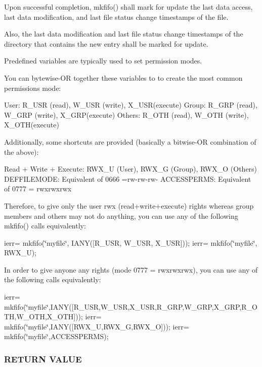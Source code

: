 Upon successful completion, mkfifo() shall mark for update the last data access, last data modification, and last file status change timestamps of the file.

Also, the last data modification and last file status change timestamps of the directory that contains the new entry shall be marked for update.

Predefined variables are typically used to set permission modes.

You can bytewise-\/\+OR together these variables to to create the most common permissions mode\+:

User\+: R\+\_\+\+U\+SR (read), W\+\_\+\+U\+SR (write), X\+\_\+\+U\+S\+R(execute) Group\+: R\+\_\+\+G\+RP (read), W\+\_\+\+G\+RP (write), X\+\_\+\+G\+R\+P(execute) Others\+: R\+\_\+\+O\+TH (read), W\+\_\+\+O\+TH (write), X\+\_\+\+O\+T\+H(execute)

Additionally, some shortcuts are provided (basically a bitwise-\/\+OR combination of the above)\+:

Read + Write + Execute\+: R\+W\+X\+\_\+U (User), R\+W\+X\+\_\+G (Group), R\+W\+X\+\_\+O (Others) D\+E\+F\+F\+I\+L\+E\+M\+O\+DE\+: Equivalent of 0666 =rw-\/rw-\/rw-\/ A\+C\+C\+E\+S\+S\+P\+E\+R\+MS\+: Equivalent of 0777 = rwxrwxrwx

Therefore, to give only the user rwx (read+write+execute) rights whereas group members and others may not do anything, you can use any of the following mkfifo() calls equivalently\+:

ierr= mkfifo(\char`\"{}myfile\char`\"{}, I\+A\+N\+Y(\mbox{[}\+R\+\_\+\+U\+S\+R, W\+\_\+\+U\+S\+R, X\+\_\+\+U\+S\+R\mbox{]})); ierr= mkfifo(\char`\"{}myfile\char`\"{}, R\+W\+X\+\_\+U);

In order to give anyone any rights (mode 0777 = rwxrwxrwx), you can use any of the following calls equivalently\+:

ierr= mkfifo(\char`\"{}myfile\char`\"{},I\+A\+N\+Y(\mbox{[}\+R\+\_\+\+U\+S\+R,\+W\+\_\+\+U\+S\+R,\+X\+\_\+\+U\+S\+R,\+R\+\_\+\+G\+R\+P,\+W\+\_\+\+G\+R\+P,\+X\+\_\+\+G\+R\+P,\+R\+\_\+\+O\+T\+H,\+W\+\_\+\+O\+T\+H,\+X\+\_\+\+O\+T\+H\mbox{]})); ierr= mkfifo(\char`\"{}myfile\char`\"{},I\+A\+N\+Y(\mbox{[}\+R\+W\+X\+\_\+\+U,\+R\+W\+X\+\_\+\+G,\+R\+W\+X\+\_\+\+O\mbox{]})); ierr= mkfifo(\char`\"{}myfile\char`\"{},A\+C\+C\+E\+S\+S\+P\+E\+R\+MS); \subsubsection*{R\+E\+T\+U\+RN V\+A\+L\+UE}

